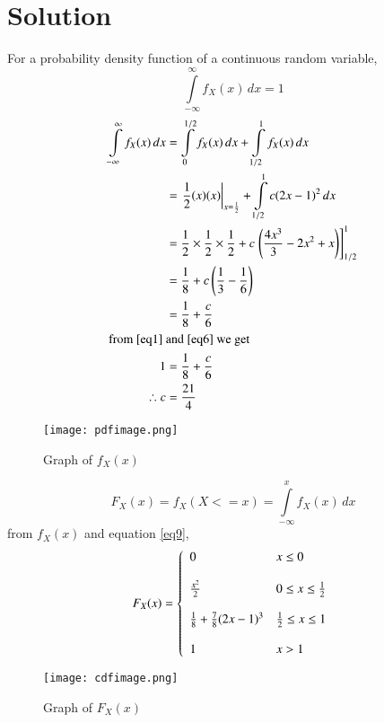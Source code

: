 \documentclass[journal,12pt,twocolumn]{IEEEtran}
\begin{document}
\section*{Solution}
For a probability density function of a continuous random variable, 
\begin{equation}
    \int \limits_{-\infty}^{\infty} f_X(x) \, dx = 1 \label{eq1}
\end{equation}
\begin{align}
    \int \limits_{-\infty}^{\infty} f_X(x) \, dx &=  \int \limits_0^{1/2} f_X(x) \, dx + \int \limits_{1/2}^1 f_X(x) \, dx\\
    &= \left. \frac{1}{2} (x)(x) \right\rvert_{x = \frac{1}{2}} + \int \limits_{1/2}^1 c(2x-1)^2 \, dx\\
    &= \frac{1}{2}\times\frac{1}{2}\times\frac{1}{2} + c{}\left.\left(\frac{4x^3}{3} - 2x^2 + x\right)\right]_{1/2}^1 \\
    &= \frac{1}{8} + c\left(\frac{1}{3} - \frac{1}{6}\right) \\
    &= \frac{1}{8} + \frac{c}{6}  \label{eq6}\\
    \intertext{from \eqref{eq1}  and \eqref{eq6} we get }
    1 &= \frac{1}{8} + \frac{c}{6} \\
    \therefore c &= \frac{21}{4}
\end{align}
\begin{figure}[!ht]
\centering
\texttt{[image: pdfimage.png]}
\caption{Graph of $f_X(x)$}
\end{figure}
\begin{equation} \label{eq9}
    F_X(x) = f_X(X<=x) = \int\limits_{-\infty}^x f_X(x) \, dx
\end{equation}
from $f_X(x)$ and equation \eqref{eq9}, 
\begin{displaymath}
    F_X(x)=\left\{
                    \begin{array}{ll}
                        0 & x\leq 0 \\\\
		                \frac{x^2}{2} &   0 \leq x \leq \frac{1}{2}  \\\\
		                \frac{1}{8} + \frac{7}{8} (2x-1)^3 & \frac{1}{2} \leq x \leq 1 \\\\
		                1 & x>1\\
	                \end{array}    
                \right.
\end{displaymath}
\begin{figure}[!ht]
\centering
\texttt{[image: cdfimage.png]}
\caption{Graph of $F_X(x)$}
\end{figure}
\end{document}
